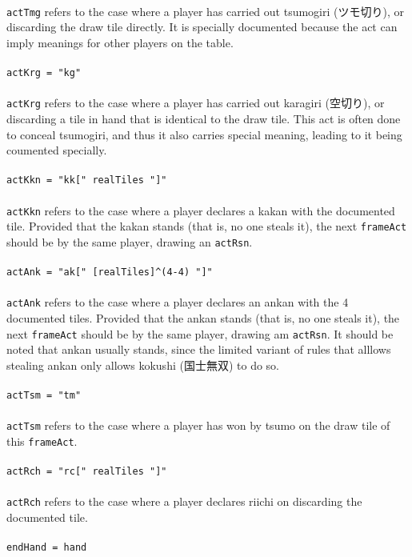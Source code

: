 \documentclass[%
	a4paper%
	,10pt%
	,twoside%
	,notitlepage%
]{article}%
\newcommand*{\ruleSymbol}{\textjapanese{⚠}}%
\newcommand*{\ruleMargin}{\marginpar{\flushright{}\ruleSymbol{}}}%
\newcommand*{\rulePar}{\paragraph*{\ruleMargin{}}}%
\begin{document}
			\paragraph*{}\lstinline/actTmg/ refers to the case where a player has carried out tsumogiri (\textjapanese{ツモ切り}), or discarding the draw tile directly. It is specially documented because the act can imply meanings for other players on the table. %
			\rulePar{}\lstinline/actKrg = "kg"/%
			\paragraph*{}\lstinline/actKrg/ refers to the case where a player has carried out karagiri (\textjapanese{空切り}), or discarding a tile in hand that is identical to the draw tile. This act is often done to conceal tsumogiri, and thus it also carries special meaning, leading to it being coumented specially. %
			\rulePar{}\lstinline/actKkn = "kk[" realTiles "]"/%
			\paragraph*{}\lstinline/actKkn/ refers to the case where a player declares a kakan with the documented tile. Provided that the kakan stands (that is, no one steals it), the next \lstinline/frameAct/ should be by the same player, drawing an \lstinline/actRsn/. %
			\rulePar{}\lstinline/actAnk = "ak[" [realTiles]^(4-4) "]"/%
			\paragraph*{}\lstinline/actAnk/ refers to the case where a player declares an ankan with the 4 documented tiles. Provided that the ankan stands (that is, no one steals it), the next \lstinline/frameAct/ should be by the same player, drawing am \lstinline/actRsn/. It should be noted that ankan usually stands, since the limited variant of rules that alllows stealing ankan only allows kokushi (\textjapanese{国士無双}) to do so. %
			\rulePar{}\lstinline/actTsm = "tm"/%
			\paragraph*{}\lstinline/actTsm/ refers to the case where a player has won by tsumo on the draw tile of this \lstinline/frameAct/. %
			\rulePar{}\lstinline/actRch = "rc[" realTiles "]"/%
			\paragraph*{}\lstinline/actRch/ refers to the case where a player declares riichi on discarding the documented tile. %
			\rulePar{}\lstinline/endHand = hand/%
\end{document}
